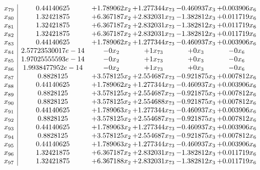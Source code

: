 \documentclass[11pt]{article}
\begin{document}
\[\begin{array}{c| c c@{\hskip 2pt} c@{\hskip 2pt} c@{\hskip 2pt} c@{\hskip 2pt} }
 x_{79}   &  0.44140625 & + 1.789062 x_{2} & + 1.277344 x_{73} & -0.460937 x_{3} & + 0.003906 x_{6}\\
 x_{80}   &  1.32421875 & + 6.367187 x_{2} & + 2.832031 x_{73} & -1.382812 x_{3} & + 0.011719 x_{6}\\
 x_{81}   &  1.32421875 & + 6.367187 x_{2} & + 2.832031 x_{73} & -1.382812 x_{3} & + 0.011719 x_{6}\\
 x_{82}   &  1.32421875 & + 6.367187 x_{2} & + 2.832031 x_{73} & -1.382812 x_{3} & + 0.011719 x_{6}\\
 x_{83}   &  0.44140625 & + 1.789062 x_{2} & + 1.277344 x_{73} & -0.460937 x_{3} & + 0.003906 x_{6}\\
 x_{84}   &  2.57723530017e-14 & -0 x_{2} & + 1 x_{73} & + 0 x_{3} & -0 x_{6}\\
 x_{85}   &  1.97025555593e-14 & -0 x_{2} & + 1 x_{73} & + 0 x_{3} & -0 x_{6}\\
 x_{86}   &  1.9938477952e-14 & -0 x_{2} & + 1 x_{73} & + 0 x_{3} & -0 x_{6}\\
 x_{87}   &  0.8828125 & + 3.578125 x_{2} & + 2.554687 x_{73} & -0.921875 x_{3} & + 0.007812 x_{6}\\
 x_{88}   &  0.44140625 & + 1.789062 x_{2} & + 1.277344 x_{73} & -0.460937 x_{3} & + 0.003906 x_{6}\\
 x_{89}   &  0.8828125 & + 3.578125 x_{2} & + 2.554687 x_{73} & -0.921875 x_{3} & + 0.007812 x_{6}\\
 x_{90}   &  0.8828125 & + 3.578125 x_{2} & + 2.554688 x_{73} & -0.921875 x_{3} & + 0.007812 x_{6}\\
 x_{91}   &  0.44140625 & + 1.789063 x_{2} & + 1.277344 x_{73} & -0.460937 x_{3} & + 0.003906 x_{6}\\
 x_{92}   &  0.8828125 & + 3.578125 x_{2} & + 2.554687 x_{73} & -0.921875 x_{3} & + 0.007812 x_{6}\\
 x_{93}   &  0.44140625 & + 1.789063 x_{2} & + 1.277344 x_{73} & -0.460937 x_{3} & + 0.003906 x_{6}\\
 x_{94}   &  0.8828125 & + 3.578125 x_{2} & + 2.554687 x_{73} & -0.921875 x_{3} & + 0.007812 x_{6}\\
 x_{95}   &  0.44140625 & + 1.789063 x_{2} & + 1.277344 x_{73} & -0.460937 x_{3} & + 0.003906 x_{6}\\
 x_{96}   &  1.32421875 & + 6.367187 x_{2} & + 2.832031 x_{73} & -1.382812 x_{3} & + 0.011719 x_{6}\\
 x_{97}   &  1.32421875 & + 6.367188 x_{2} & + 2.832031 x_{73} & -1.382812 x_{3} & + 0.011719 x_{6}\\

\end{array}\]
\end{document}
